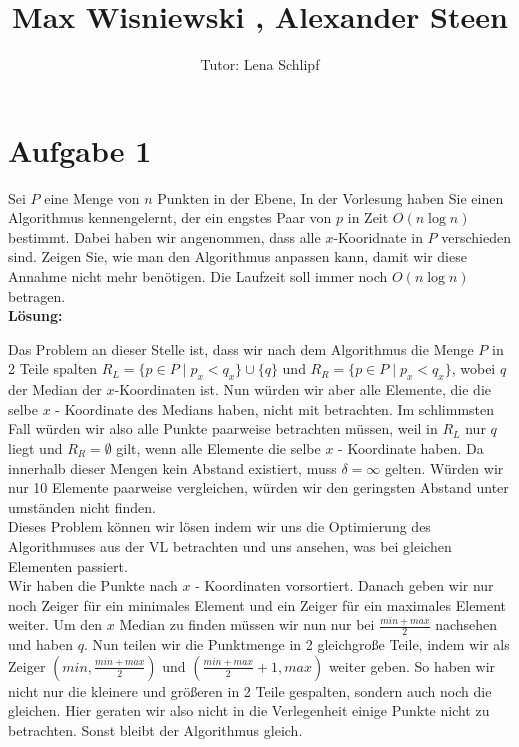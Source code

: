 \documentclass[11pt,a4paper,ngerman]{article}
\author{Tutor: Lena Schlipf}
\date{}
\title{Max Wisniewski , Alexander Steen}
\begin{document}

\maketitle
\thispagestyle{fancy}

\section*{Aufgabe 1}

Sei $P$ eine Menge von $n$ Punkten in der Ebene, In der Vorlesung haben Sie einen Algorithmus kennengelernt, der ein engstes Paar von $p$ in Zeit $O \left( n \log n \right)$ bestimmt. Dabei haben wir angenommen, dass alle $x$-Kooridnate in $P$ verschieden sind. Zeigen Sie, wie man den Algorithmus anpassen kann, damit wir diese Annahme nicht mehr benötigen. Die Laufzeit soll immer noch $O\left( n \log n \right)$ betragen.\\

\textbf{Lösung:}

Das Problem an dieser Stelle ist, dass wir nach dem Algorithmus die Menge $P$ in 2 Teile spalten $R_L = \{ p \in P \; | \; p_x < q_x\} \cup \{q\}$ und $R_R = \{ p \in P \; | \; p_x < q_x\}$, wobei $q$ der Median der $x$-Koordinaten ist. Nun würden wir aber alle Elemente, die die selbe $x$ - Koordinate des Medians haben, nicht mit betrachten. Im schlimmsten Fall würden wir also alle Punkte paarweise betrachten müssen, weil in $R_L$ nur $q$ liegt und $R_R = \emptyset$ gilt, wenn alle Elemente die selbe $x$ - Koordinate haben. Da innerhalb dieser Mengen kein Abstand existiert, muss $\delta = \infty$ gelten. Würden wir nur 10 Elemente paarweise vergleichen, würden wir den geringsten Abstand unter umständen nicht finden.\\

Dieses Problem können wir lösen indem wir uns die Optimierung des Algorithmuses aus der VL betrachten und uns ansehen, was bei gleichen Elementen passiert.\\
Wir haben die Punkte nach $x$ - Koordinaten vorsortiert. Danach geben wir nur noch Zeiger für ein minimales Element und ein Zeiger für ein maximales Element weiter. Um den $x$ Median zu finden müssen wir nun nur bei $\frac{min + max}{2}$ nachsehen und haben $q$. Nun teilen wir die Punktmenge in 2 gleichgroße Teile, indem wir als Zeiger $(min, \frac{min+max}{2})$ und $(\frac{min+max}{2}+1,max)$ weiter geben. So haben wir nicht nur die kleinere und größeren in 2 Teile gespalten, sondern auch noch die gleichen. Hier geraten wir also nicht in die Verlegenheit einige Punkte nicht zu betrachten. Sonst bleibt der Algorithmus gleich.\\
\end{document}
